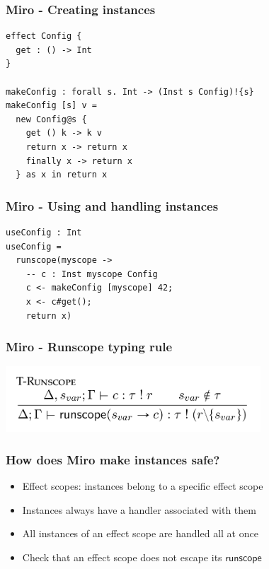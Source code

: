 \documentclass{beamer}
\begin{document}
\begin{frame}[fragile]\frametitle{Miro - Creating instances}
\begin{example}
\begin{verbatim}
effect Config {
  get : () -> Int
}

makeConfig : forall s. Int -> (Inst s Config)!{s}
makeConfig [s] v =
  new Config@s {
    get () k -> k v
    return x -> return x
    finally x -> return x
  } as x in return x
\end{verbatim}
\end{example}
\end{frame}

\begin{frame}[fragile]\frametitle{Miro - Using and handling instances}
\begin{example}
\begin{verbatim}
useConfig : Int
useConfig =
  runscope(myscope ->
    -- c : Inst myscope Config
    c <- makeConfig [myscope] 42;
    x <- c#get();
    return x)
\end{verbatim}
\end{example}
\end{frame}

\begin{frame}[fragile]\frametitle{Miro - Runscope typing rule}
\begin{center}
\includegraphics[width=270pt]{images/typing-rule.png}
\end{center}
\end{frame}

\begin{frame}[fragile]\frametitle{How does Miro make instances safe?}
\begin{itemize}
\item Effect scopes: instances belong to a specific effect scope
\item Instances always have a handler associated with them
\item All instances of an effect scope are handled all at once
\item Check that an effect scope does not escape its $\mathsf{runscope}$
\end{itemize}
\end{frame}
\end{document}
